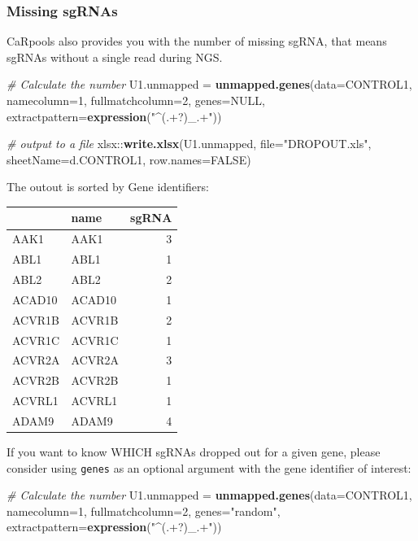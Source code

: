 \documentclass[]{article}
\newenvironment{Shaded}{\begin{snugshade}}{\end{snugshade}}
\newcommand{\KeywordTok}[1]{\textcolor[rgb]{0.13,0.29,0.53}{\textbf{{#1}}}}
\newcommand{\DataTypeTok}[1]{\textcolor[rgb]{0.13,0.29,0.53}{{#1}}}
\newcommand{\DecValTok}[1]{\textcolor[rgb]{0.00,0.00,0.81}{{#1}}}
\newcommand{\StringTok}[1]{\textcolor[rgb]{0.31,0.60,0.02}{{#1}}}
\newcommand{\CommentTok}[1]{\textcolor[rgb]{0.56,0.35,0.01}{\textit{{#1}}}}
\newcommand{\OtherTok}[1]{\textcolor[rgb]{0.56,0.35,0.01}{{#1}}}
\newcommand{\NormalTok}[1]{{#1}}
\begin{document}
\subsubsection{Missing sgRNAs}\label{missing-sgrnas}

CaRpools also provides you with the number of missing sgRNA, that means
sgRNAs without a single read during NGS.

\begin{Shaded}
\begin{Highlighting}[]
\CommentTok{# Calculate the number}
\NormalTok{U1.unmapped =}\StringTok{ }\KeywordTok{unmapped.genes}\NormalTok{(}\DataTypeTok{data=}\NormalTok{CONTROL1, }\DataTypeTok{namecolumn=}\DecValTok{1}\NormalTok{, }\DataTypeTok{fullmatchcolumn=}\DecValTok{2}\NormalTok{, }\DataTypeTok{genes=}\OtherTok{NULL}\NormalTok{, }\DataTypeTok{extractpattern=}\KeywordTok{expression}\NormalTok{(}\StringTok{"^(.+?)_.+"}\NormalTok{))}

\CommentTok{# output to a file}
\NormalTok{xlsx::}\KeywordTok{write.xlsx}\NormalTok{(U1.unmapped, }\DataTypeTok{file=}\StringTok{"DROPOUT.xls"}\NormalTok{, }\DataTypeTok{sheetName=}\NormalTok{d.CONTROL1, }\DataTypeTok{row.names=}\OtherTok{FALSE}\NormalTok{)}
\end{Highlighting}
\end{Shaded}

The outout is sorted by Gene identifiers:

\begin{longtable}[c]{@{}llr@{}}
\toprule
& name & sgRNA\tabularnewline
\midrule
\endhead
AAK1 & AAK1 & 3\tabularnewline
ABL1 & ABL1 & 1\tabularnewline
ABL2 & ABL2 & 2\tabularnewline
ACAD10 & ACAD10 & 1\tabularnewline
ACVR1B & ACVR1B & 2\tabularnewline
ACVR1C & ACVR1C & 1\tabularnewline
ACVR2A & ACVR2A & 3\tabularnewline
ACVR2B & ACVR2B & 1\tabularnewline
ACVRL1 & ACVRL1 & 1\tabularnewline
ADAM9 & ADAM9 & 4\tabularnewline
\bottomrule
\end{longtable}

If you want to know WHICH sgRNAs dropped out for a given gene, please
consider using \texttt{genes} as an optional argument with the gene
identifier of interest:

\begin{Shaded}
\begin{Highlighting}[]
\CommentTok{# Calculate the number}
\NormalTok{U1.unmapped =}\StringTok{ }\KeywordTok{unmapped.genes}\NormalTok{(}\DataTypeTok{data=}\NormalTok{CONTROL1, }\DataTypeTok{namecolumn=}\DecValTok{1}\NormalTok{, }\DataTypeTok{fullmatchcolumn=}\DecValTok{2}\NormalTok{, }\DataTypeTok{genes=}\StringTok{"random"}\NormalTok{, }\DataTypeTok{extractpattern=}\KeywordTok{expression}\NormalTok{(}\StringTok{"^(.+?)_.+"}\NormalTok{))}
\end{Highlighting}
\end{Shaded}
\end{document}
